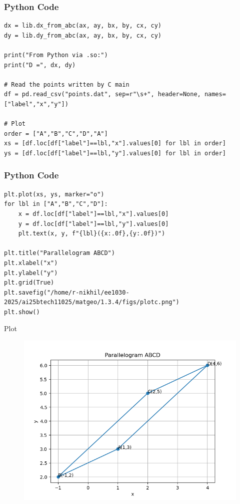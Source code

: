 \documentclass{beamer}
\begin{document}
\begin{frame}[fragile]
\frametitle{Python Code}
   \begin{lstlisting}
dx = lib.dx_from_abc(ax, ay, bx, by, cx, cy)
dy = lib.dy_from_abc(ax, ay, bx, by, cx, cy)

print("From Python via .so:")
print("D =", dx, dy)

# Read the points written by C main
df = pd.read_csv("points.dat", sep=r"\s+", header=None, names=["label","x","y"])

# Plot
order = ["A","B","C","D","A"]
xs = [df.loc[df["label"]==lbl,"x"].values[0] for lbl in order]
ys = [df.loc[df["label"]==lbl,"y"].values[0] for lbl in order]
   \end{lstlisting}
\end{frame}
\begin{frame}[fragile]
\frametitle{Python Code}
   \begin{lstlisting}
plt.plot(xs, ys, marker="o")
for lbl in ["A","B","C","D"]:
    x = df.loc[df["label"]==lbl,"x"].values[0]
    y = df.loc[df["label"]==lbl,"y"].values[0]
    plt.text(x, y, f"{lbl}({x:.0f},{y:.0f})")

plt.title("Parallelogram ABCD")
plt.xlabel("x")
plt.ylabel("y")
plt.grid(True)
plt.savefig("/home/r-nikhil/ee1030-2025/ai25btech11025/matgeo/1.3.4/figs/plotc.png")
plt.show()
\end{lstlisting}
\end{frame}

\begin{frame}{Plot}
    \begin{figure}[h!]
    \centering
    \includegraphics[height=0.6\textheight, keepaspectratio]{figs/plotc.png}
    \label{figure_1}
\end{figure}
\end{frame}
\end{document}
